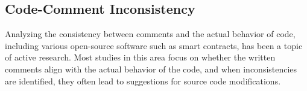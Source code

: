 \documentclass[10pt, conference]{IEEEtran}
\begin{document}
    \subsection{Code-Comment Inconsistency}

        Analyzing the consistency between comments and the actual behavior of code, including various open-source software such as smart contracts, has been a topic of active research. Most studies in this area focus on whether the written comments align with the actual behavior of the code, and when inconsistencies are identified, they often lead to suggestions for source code modifications.
\end{document}
